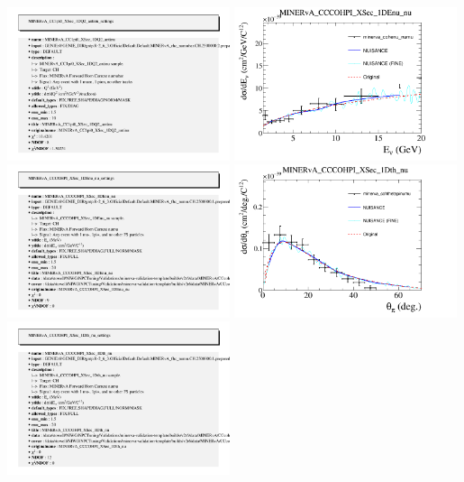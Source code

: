\documentclass{article}
\begin{document}
\includegraphics[width=0.49\textwidth]{figures/minerva_cc1pi0q2_2016_info.png}
\centering
\includegraphics[width=0.49\textwidth]{figures/minerva_cohenu_numu_comp.png}
\includegraphics[width=0.49\textwidth]{figures/minerva_cohenu_numu_info.png}
\centering
\includegraphics[width=0.49\textwidth]{figures/minerva_cohthetapinumu_comp.png}
\includegraphics[width=0.49\textwidth]{figures/minerva_cohthetapinumu_info.png}
\end{document}
